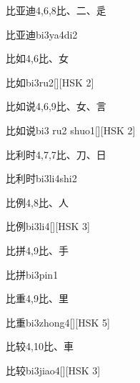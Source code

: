 \begin{entry}{比亚迪}{4,6,8}{⽐、⼆、⾡}
  \begin{phonetics}{比亚迪}{bi3ya4di2}
  \end{phonetics}
\end{entry}

\begin{entry}{比如}{4,6}{⽐、⼥}
  \begin{phonetics}{比如}{bi3ru2}[][HSK 2]
  \end{phonetics}
\end{entry}

\begin{entry}{比如说}{4,6,9}{⽐、⼥、⾔}
  \begin{phonetics}{比如说}{bi3 ru2 shuo1}[][HSK 2]
  \end{phonetics}
\end{entry}

\begin{entry}{比利时}{4,7,7}{⽐、⼑、⽇}
  \begin{phonetics}{比利时}{bi3li4shi2}
  \end{phonetics}
\end{entry}

\begin{entry}{比例}{4,8}{⽐、⼈}
  \begin{phonetics}{比例}{bi3li4}[][HSK 3]
  \end{phonetics}
\end{entry}

\begin{entry}{比拼}{4,9}{⽐、⼿}
  \begin{phonetics}{比拼}{bi3pin1}
  \end{phonetics}
\end{entry}

\begin{entry}{比重}{4,9}{⽐、⾥}
  \begin{phonetics}{比重}{bi3zhong4}[][HSK 5]
  \end{phonetics}
\end{entry}

\begin{entry}{比较}{4,10}{⽐、⾞}
  \begin{phonetics}{比较}{bi3jiao4}[][HSK 3]
  \end{phonetics}
\end{entry}

